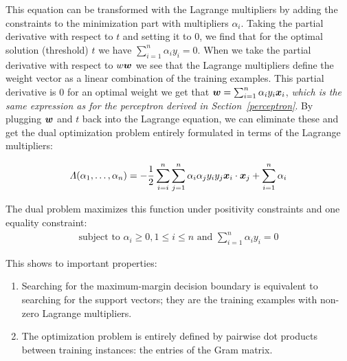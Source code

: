 This equation can be transformed with the Lagrange multipliers by adding the constraints to the minimization part with multipliers $\alpha_i$.
Taking the partial derivative with respect to $t$ and setting it to $0$, we find that for the optimal solution (threshold) $t$ we have $\sum_{i=1}^{n} \alpha_i y_i = 0$.
When we take the partial derivative with respect to $w\vectorsym{w}$ we see that the Lagrange multipliers define the weight vector as a linear combination of the training examples.
This partial derivative is $0$ for an optimal weight we get that $\vectorsym{w} = \sum_{i=1}^{n} \alpha_i y_i \vectorsym{x}_i$, \emph{which is the same expression as for the perceptron derived in Section~\ref{perceptron}}.
By plugging $\vectorsym{w}$ and $t$ back into the Lagrange equation, we can eliminate these and get the dual optimization problem entirely formulated in terms of the Lagrange multipliers:

\begin{equation}
  \Lambda(\alpha_1, \dots, \alpha_n) = - \frac{1}{2} \sum\limits_{i=i}^n \sum\limits_{j=1}^n \alpha_i \alpha_j y_i y_j \vectorsym{x}_i \cdot \vectorsym{x}_j + \sum\limits_{i=1}^n \alpha_i
\end{equation}

The dual problem maximizes this function under positivity constraints and one equality constraint:
\begin{equation}
\begin{aligned}
  \text{subject to } \alpha_i \geq 0, 1 \leq i \leq n \text{ and } \sum\limits_{i=1}^n \alpha_i y_i = 0
\end{aligned}
\end{equation}

This shows to important properties:
\begin{enumerate}
  \item Searching for the maximum-margin decision boundary is equivalent to searching for the support vectors; they are the training examples with non-zero Lagrange multipliers.
  \item The optimization problem is entirely defined by pairwise dot products between training instances: the entries of the Gram matrix.
\end{enumerate}

